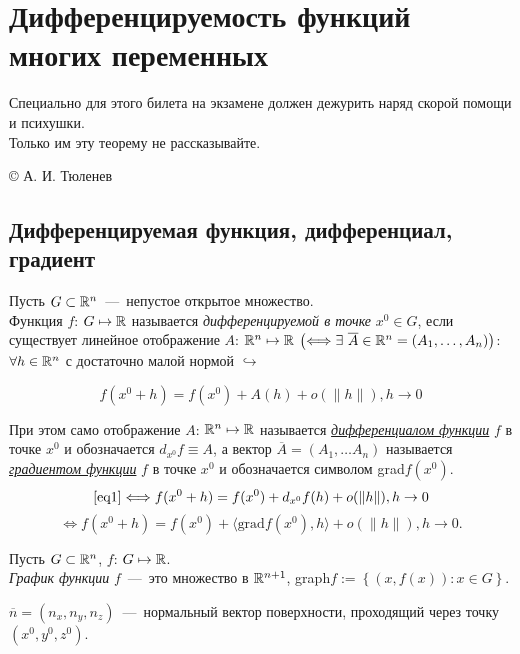 \newpage

\section{Дифференцируемость функций многих переменных}
\setlength{\epigraphwidth}{0.5\textwidth}
\epigraph{\normalsize{Специально для этого билета на экзамене должен дежурить наряд скорой помощи и психушки.\\ Только им эту теорему не рассказывайте. }}{\large{© А. И. Тюленев}}
\subsection{Дифференцируемая функция, дифференциал, градиент}
\begin{definition}
    Пусть $G \subset \mathbb{R} ^n$~---~непустое открытое множество. \\ Функция $f$: $G \mapsto \mathbb{R}$ называется \textit{дифференцируемой в точке} $x^0 \in G$, если существует линейное отображение $A$: $\mathbb{R}^n \mapsto \mathbb{R}$  $\left( \Longleftrightarrow \exists \ \overline{A} \in \mathbb{R}^n = (A_{1}, \ldots, A_{n})\right) $: $\forall h \in \mathbb{R}^n$ с достаточно малой нормой $\hookrightarrow$

    \begin{equation}\label{eq1}\tag{$\star$}
         f(x^0 + h) = f(x^0) + A(h) + o(\|h\|), h \to 0 
    \end{equation}

    При этом само отображение $A$: $\mathbb{R}^n \mapsto \mathbb{R}$ называется \underline{\textit{дифференциалом функции}} $f$ в точке $x^0$ и обозначается $d_{x^0} f \equiv A$, а вектор $\overline{A} = \left(A_1, \ldots A_n \right)$ называется \underline{\textit{градиентом функции}} $f$ в точке $x^0$ и обозначается символом grad$f(x^0)$. \\

    $$ \eqref{eq1} \Longleftrightarrow f(x^0 + h) = f(x^0) + d_{x^0} f(h) + o(\|h\|), h \to 0 $$
    $$ \Longleftrightarrow f(x^0 + h) = f(x^0) + \langle \text{grad}f(x^0), h\rangle + o(\|h\|), h \to 0.$$
\end{definition}

\begin{definition}
    Пусть $G \subset \mathbb{R}^n$, $f$: $G \mapsto \mathbb{R}$. \\
    \textit{График функции} $f$~---~это множество в $\mathbb{R}^{n+1}$, graph$f := \left\{ (x, f(x)): x \in G\right\}$.
\end{definition}

$\overline{n} = (n_x, n_y, n_z)$~---~нормальный вектор поверхности, проходящий через точку $(x^0, y^0, z^0)$.

